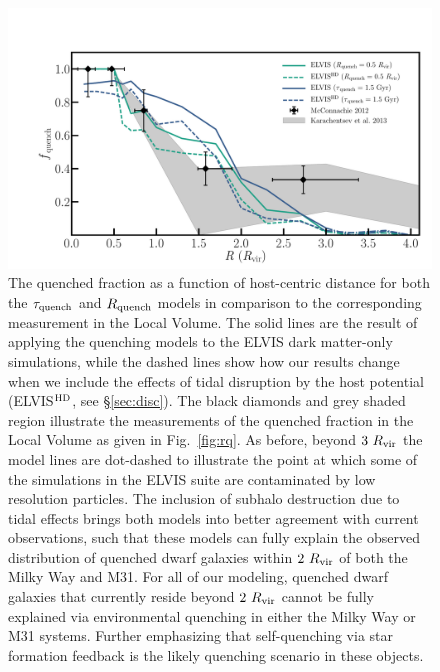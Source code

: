
\begin{figure}
 \centering
 \hspace*{-0.1in}
 \includegraphics[width=6in]{fieldquench/fig4.pdf}
 \caption[Radial quenched fraction including subhalo destruction]{The quenched fraction as a function of host-centric distance for both
   the $\tau_{\rm quench}$ and $R_{\rm quench}$ models in comparison to the
   corresponding measurement in the Local Volume. The solid lines are the result
   of applying the quenching models to the ELVIS dark matter-only simulations,
   while the dashed lines show how our results change when we include the
   effects of tidal disruption by the host potential (ELVIS$^{\rm HD}$, see
   \S\ref{sec:disc}). The black diamonds and grey shaded region illustrate the
   measurements of the quenched fraction in the Local Volume as given in
   Fig.~\ref{fig:rq}.
   As before, beyond $3~R_{\rm{vir}}$ the model lines are dot-dashed to illustrate the
   point at which some of the simulations in the ELVIS suite are
   contaminated by low resolution particles.
   The inclusion of subhalo destruction due to tidal effects
   brings both models into better agreement with current observations, such that
   these models can fully explain the observed distribution of quenched dwarf
   galaxies within $2~R_{\rm{vir}}$ of both the Milky Way and M31.
   For all of our modeling, quenched dwarf galaxies that currently
   reside beyond $2~R_{\rm{vir}}$ cannot be fully explained via environmental
   quenching in either the Milky Way or M31 systems. Further
   emphasizing that self-quenching via star formation feedback is the
   likely quenching scenario in these objects. }
 \label{fig:destruct}
\end{figure}

